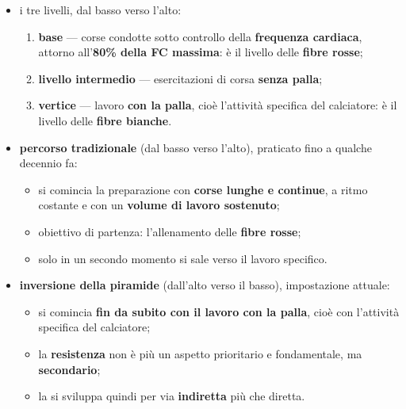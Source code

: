 \begin{itemize}
  \item i tre livelli, dal basso verso l'alto:
    \begin{enumerate}
      \item \textbf{base} --- corse condotte sotto controllo della \textbf{frequenza cardiaca},
        attorno all'\textbf{80\% della FC massima}: è il livello delle \textbf{fibre rosse};
      \item \textbf{livello intermedio} --- esercitazioni di corsa \textbf{senza palla};
      \item \textbf{vertice} --- lavoro \textbf{con la palla}, cioè l'attività specifica del
        calciatore: è il livello delle \textbf{fibre bianche}.
    \end{enumerate}
  \item \textbf{percorso tradizionale} (dal basso verso l'alto), praticato fino a qualche decennio
    fa:
    \begin{itemize}
      \item si comincia la preparazione con \textbf{corse lunghe e continue}, a ritmo costante e
        con un \textbf{volume di lavoro sostenuto};
      \item obiettivo di partenza: l'allenamento delle \textbf{fibre rosse};
      \item solo in un secondo momento si sale verso il lavoro specifico.
    \end{itemize}
  \item \textbf{inversione della piramide} (dall'alto verso il basso), impostazione attuale:
    \begin{itemize}
      \item si comincia \textbf{fin da subito con il lavoro con la palla}, cioè con l'attività
        specifica del calciatore;
      \item la \textbf{resistenza} non è più un aspetto prioritario e fondamentale, ma
        \textbf{secondario};
      \item la si sviluppa quindi per via \textbf{indiretta} più che diretta.
    \end{itemize}
\end{itemize}
